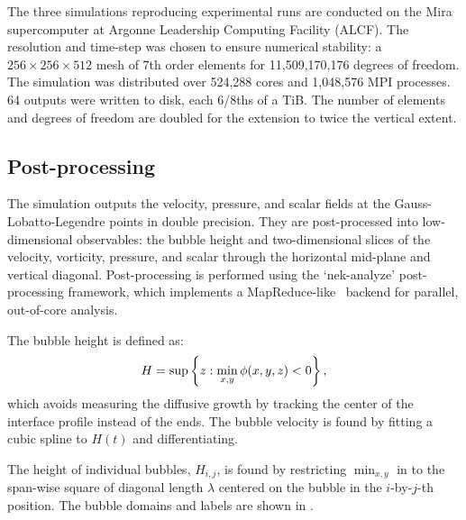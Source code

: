 The three simulations reproducing experimental runs are conducted on the Mira supercomputer at Argonne Leadership Computing Facility (ALCF).
The resolution and time-step was chosen to ensure numerical stability: a $256\times256\times512$ mesh of 7th order elements for 11,509,170,176 degrees of freedom.
The simulation was distributed over 524,288 cores and 1,048,576 MPI processes.
64 outputs were written to disk, each 6/8ths of a TiB.
The number of elements and degrees of freedom are doubled for the extension to twice the vertical extent.

\subsection{Post-processing}
The simulation outputs the velocity, pressure, and scalar fields at the Gauss-Lobatto-Legendre points in double precision.
They are post-processed into low-dimensional observables: the bubble height and two-dimensional slices of the velocity, vorticity, pressure, and scalar through the horizontal mid-plane and vertical diagonal.
Post-processing is performed using the `nek-analyze' post-processing framework, which implements a MapReduce-like~\cite{dean2008mapreduce} backend for parallel, out-of-core analysis.

The bubble height is defined as:
\begin{equation} \elabel{h_exp}
H = \sup \left\{ z : \min_{x,y} \phi(x,y,z) < 0\right\},
\end{equation}
which avoids measuring the diffusive growth by tracking the center of the interface profile instead of the ends.
The bubble velocity is found by fitting a cubic spline to $H(t)$ and differentiating.

The height of individual bubbles, $H_{i,j}$, is found by restricting $\min_{x,y}$ in  to the span-wise square of diagonal length $\lambda$ centered on the bubble in the $i$-by-$j$-th position.
The bubble domains and labels are shown in .

